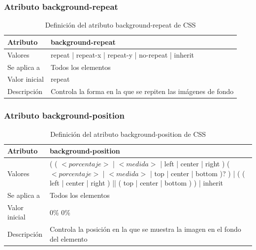 \documentclass[ucs]{beamer}
\begin{document}
\begin{frame}
\frametitle{Atributo background-repeat}

\begin{center}
  \begin{table}
   \begin{tabular}{p{1.8cm}p{7.8cm}}
Atributo & \bf{background-repeat} \\ \hline
Valores& repeat | repeat-x | repeat-y | no-repeat | inherit \\ \hline
Se aplica a& Todos los elementos \\ \hline
Valor inicial& repeat \\ \hline
Descripción& Controla la forma en la que se repiten las imágenes de fondo \\ \hline
  \end{tabular}
   \caption{Definición del atributo background-repeat de CSS}
 \end{table}
\end{center}


\end{frame}



\begin{frame}
\frametitle{Atributo background-position}

\begin{center}
  \begin{table}
   \begin{tabular}{p{1.8cm}p{7.8cm}}
Atributo & \bf{background-position} \\ \hline
Valores& ( ( $<porcentaje>$ | $<medida>$ | left | center | right ) ( $<porcentaje>$ | $<medida>$ | top | center | bottom )? ) | ( ( left | center | right ) || ( top | center | bottom ) ) | inherit \\ \hline
Se aplica a& Todos los elementos \\ \hline
Valor inicial& 0\% 0\% \\ \hline
Descripción& Controla la posición en la que se muestra la imagen en el fondo del elemento \\ \hline
  \end{tabular}
   \caption{Definición del atributo background-position de CSS}
 \end{table}
\end{center}


\end{frame}


\end{document}
